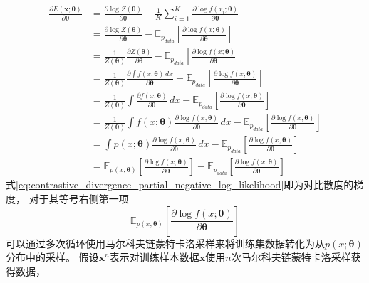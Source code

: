 \begin{align}
    \frac{\partial E(\bm{x};\bm{\theta})}{\partial \bm{\theta}}
    &= \frac{\partial  \log Z(\bm{\theta}) }{\partial \bm{\theta}} -  \frac{1}{K}  \sum_{i=1}^{K} \frac{\partial \log f(x_i;\bm{\theta})}{\partial \bm{\theta}} \\
    &= \frac{\partial  \log Z(\bm{\theta}) }{\partial \bm{\theta}} - \mathbb{E}_{p_{data}}  \left [ \frac{\partial \log f(x;\bm{\theta})}{\partial \bm{\theta}} \right ] \\
    &= \frac{1}{Z(\bm{\theta})} \frac{\partial  Z(\bm{\theta}) }{\partial \bm{\theta}} - \mathbb{E}_{p_{data}}  \left [ \frac{\partial \log f(x;\bm{\theta})}{\partial \bm{\theta}} \right ] \\
    &= \frac{1}{Z(\bm{\theta})}  \frac{\partial  \int f(x;\bm{\theta}) \,dx }{\partial \bm{\theta}}     - \mathbb{E}_{p_{data}}  \left [ \frac{\partial \log f(x;\bm{\theta})}{\partial \bm{\theta}} \right ] \\
    &=  \frac{1}{Z(\bm{\theta})} \int \frac{\partial   f(x;\bm{\theta})  }{\partial \bm{\theta}}   \,dx    - \mathbb{E}_{p_{data}}  \left [ \frac{\partial \log f(x;\bm{\theta})}{\partial \bm{\theta}} \right ] \\
    &=   \frac{1}{Z(\bm{\theta})} \int  f(x;\bm{\theta})  \frac{\partial \log  f(x;\bm{\theta}) }{\partial \bm{\theta}}   \,dx     - \mathbb{E}_{p_{data}}  \left [ \frac{\partial \log f(x;\bm{\theta})}{\partial \bm{\theta}} \right ] \\
    &=  \int  p(x;\bm{\theta})  \frac{\partial \log  f(x;\bm{\theta}) }{\partial \bm{\theta}}   \,dx    - \mathbb{E}_{p_{data}}  \left [ \frac{\partial \log f(x;\bm{\theta})}{\partial \bm{\theta}} \right ] \\
    &=   \mathbb{E}_{p(x;\bm{\theta})} \left [      \frac{\partial \log  f(x;\bm{\theta}) }{\partial \bm{\theta}}      \right ]   - \mathbb{E}_{p_{data}}  \left [ \frac{\partial \log f(x;\bm{\theta})}{\partial \bm{\theta}} \right ] \label{eq:contrastive_divergence_partial_negative_log_likelihood}
\end{align}
式{\ref{eq:contrastive_divergence_partial_negative_log_likelihood}}即为对比散度的梯度，
对于其等号右侧第一项
\begin{equation}
    \mathbb{E}_{p(x;\bm{\theta})} \left [      \frac{\partial \log  f(x;\bm{\theta}) }{\partial \bm{\theta}}      \right ]
\end{equation}
可以通过多次循环使用马尔科夫链蒙特卡洛采样来将训练集数据转化为从{$p(x;\bm{\theta})$}分布中的采样。
假设{$\bm{x}^{n}$}表示对训练样本数据{$\bm{x}$}使用{$n$}次马尔科夫链蒙特卡洛采样获得数据，
